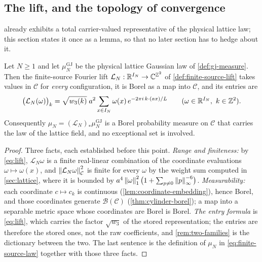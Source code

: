 \subsection{The lift, and the topology of convergence}

 already exhibits a total carrier-valued representative of the
physical lattice law; this section states it once as a lemma, so that no later
section has to hedge about it.

\begin{lemma}
\label{lem:lift-representative}
Let $N\ge1$ and let $\mu^{\mathrm{GJ}}_N$ be the physical lattice Gaussian law of
\cref{def:gj-measure}. Then the finite-source Fourier lift
$\mathcal L_N:\mathbb{R}^{I_N}\to\mathbb{C}^{\mathbb{Z}^2}$ of \cref{def:finite-source-lift} takes
values in $\mathcal C$ for \emph{every} configuration, it is Borel as a map into
$\mathcal C$, and its entries are
\begin{equation}\label{eq:lift-coordinate-identity}
  \bigl(\mathcal L_N(\omega)\bigr)_k
  =\sqrt{w_3(k)}\;a^{2}\sum_{x\in I_N}\omega(x)\,e^{-2\pi i\,k\cdot(ax)/L}
  \qquad(\omega\in\mathbb{R}^{I_N},\ k\in\mathbb{Z}^2).
\end{equation}
Consequently $\mu_N=(\mathcal L_N)_*\mu^{\mathrm{GJ}}_N$ is a Borel probability
measure on $\mathcal C$ that carries the law of the lattice field, and no
exceptional set is involved.
\end{lemma}

\begin{proof}
Three facts, each established before this point. \emph{Range and finiteness:} by
\eqref{eq:lift}, $\mathcal L_N\omega$ is a finite real-linear combination of the
coordinate evaluations $\omega\mapsto\omega(x)$, and
$\left\| \mathcal L_N\omega \right\|_{\mathcal C}^{2}$ is finite for every $\omega$ by the
weight sum computed in \cref{sec:lattice}, where it is bounded by
$a^4\left\| \omega \right\|_1^2\bigl(1+\sum_{p\ne0}\left\| p \right\|_\infty^{-6}\bigr)$.
\emph{Measurability:} each coordinate $c\mapsto c_k$ is continuous
(\cref{lem:coordinate-embedding}), hence Borel, and those coordinates generate
$\mathcal B(\mathcal C)$ (\cref{thm:cylinder-borel}); a map into a separable
metric space whose coordinates are Borel is Borel. \emph{The entry formula} is
\eqref{eq:lift}, which carries the factor $\sqrt{w_3}$ of the stored
representation; the entries are therefore the stored ones, not the raw
coefficients, and \cref{rem:two-families} is the dictionary between the two. The
last sentence is the definition of $\mu_N$ in \cref{eq:finite-source-law}
together with those three facts.
\end{proof}

